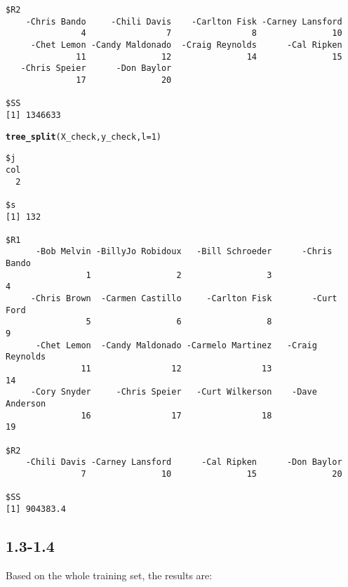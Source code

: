 \documentclass[10pt, a4paper, english]{article}\usepackage[]{graphicx}\usepackage[dvipsnames]{xcolor}
\makeatletter
\newcommand{\hlnum}[1]{\textcolor[rgb]{0.686,0.059,0.569}{#1}}%
\newcommand{\hlstd}[1]{\textcolor[rgb]{0.345,0.345,0.345}{#1}}%
\newcommand{\hlkwc}[1]{\textcolor[rgb]{0.333,0.667,0.333}{#1}}%
\newcommand{\hlkwd}[1]{\textcolor[rgb]{0.737,0.353,0.396}{\textbf{#1}}}%
\newenvironment{kframe}{%
 \def\at@end@of@kframe{}%
 \ifinner\ifhmode%
  \def\at@end@of@kframe{\end{minipage}}%
  \begin{minipage}{\columnwidth}%
 \fi\fi%
 \def\FrameCommand##1{\hskip\@totalleftmargin \hskip-\fboxsep
 \colorbox{shadecolor}{##1}\hskip-\fboxsep
     \hskip-\linewidth \hskip-\@totalleftmargin \hskip\columnwidth}%
 \MakeFramed {\advance\hsize-\width
   \@totalleftmargin\z@ \linewidth\hsize
   \@setminipage}}%
 {\par\unskip\endMakeFramed%
 \at@end@of@kframe}
\newenvironment{knitrout}{}{} %
\makeatother
\begin{document}
\begin{knitrout}
\begin{kframe}
\begin{verbatim}
$R2
    -Chris Bando     -Chili Davis    -Carlton Fisk -Carney Lansford 
               4                7                8               10 
     -Chet Lemon -Candy Maldonado  -Craig Reynolds      -Cal Ripken 
              11               12               14               15 
   -Chris Speier      -Don Baylor 
              17               20 

$SS
[1] 1346633
\end{verbatim}
\begin{alltt}
\hlkwd{tree_split}\hlstd{(X_check, y_check,} \hlkwc{l} \hlstd{=} \hlnum{1}\hlstd{)}
\end{alltt}
\begin{verbatim}
$j
col 
  2 

$s
[1] 132

$R1
      -Bob Melvin -BillyJo Robidoux   -Bill Schroeder      -Chris Bando 
                1                 2                 3                 4 
     -Chris Brown  -Carmen Castillo     -Carlton Fisk        -Curt Ford 
                5                 6                 8                 9 
      -Chet Lemon  -Candy Maldonado -Carmelo Martinez   -Craig Reynolds 
               11                12                13                14 
     -Cory Snyder     -Chris Speier   -Curt Wilkerson    -Dave Anderson 
               16                17                18                19 

$R2
    -Chili Davis -Carney Lansford      -Cal Ripken      -Don Baylor 
               7               10               15               20 

$SS
[1] 904383.4
\end{verbatim}
\end{kframe}
\end{knitrout}

\subsection{1.3-1.4}
Based on the whole training set, the results are:
\end{document}
